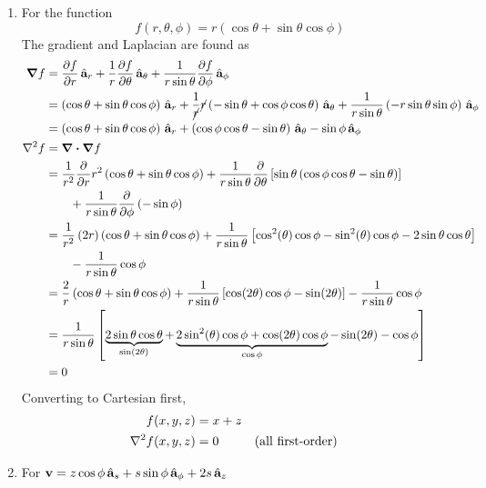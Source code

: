 \documentclass{homework}
\begin{document}
\begin{enumerate}
		\item For the function
		\[			f(r, \theta, \phi)  = r\left(\cos \theta + \sin \theta \cos \phi \right)\]
		The gradient and Laplacian are found as
		\begin{align*}
			\grad{ f } & = \pdv{f}{r} \uvec{r}
				+ \frac{1}{r} \pdv{f}{\theta} \uvec{\theta}
				+ \frac{1}{r \sin \theta} \pdv{f}{\phi} \uvec{\phi} \\
				& = \left( \cos \theta + \sin \theta \cos \phi\right) \uvec{r}
				+ \frac{1}{\cancel{r}} \cancel{r} \left(-\sin \theta + \cos \phi \cos \theta\right) \uvec{\theta}
				+  \frac{1}{r \sin \theta} \left(-r \sin \theta \sin \phi\right) \uvec{\phi}\\
				& = \left(\cos \theta + \sin \theta \cos \phi\right) \uvec{r} + \left(\cos \phi \cos \theta - \sin \theta\right) \uvec{\theta} 
				- \sin \phi \uvec{\phi} \\
			\laplacian{f} & = \div{ \grad{f} } \\
				& = \frac{1}{r^2} \pdv{r} r^2 \left(\cos \theta + \sin \theta \cos \phi\right)
				+ \frac{1}{r \sin \theta} \pdv{\theta} \left[\sin \theta \left(\cos \phi \cos \theta - \sin \theta\right)\right] \\
				& \qquad + \frac{1}{r \sin \theta} \pdv{\phi} \left(- \sin \phi\right) \\
				& = \frac{1}{r^2} \left(2r\right) \left(\cos \theta + \sin\theta \cos \phi \right)
				+ \frac{1}{r\sin \theta} \left[
					\cos[2](\theta) \cos \phi - \sin[2](\theta) \cos \phi - 2 \sin \theta \cos \theta
				\right] \\
				& \qquad - \frac{1}{r \sin \theta} \cos \phi \\
				& = \frac{2}{r} \left( \cos \theta + \sin \theta \cos \phi\right)
					+ \frac{1}{r \sin \theta} \left[ \cos(2 \theta) \cos \phi - \sin(2 \theta)\right]
					- \frac{1}{r \sin \theta} \cos \phi \\
				& = \frac{1}{r \sin \theta} \left[
					\underbrace{2 \sin \theta \cos \theta}_{\sin(2 \theta)} + \underbrace{2 \sin[2](\theta) \cos \phi + \cos(2 \theta) \cos \phi}_{\cos \phi} - \sin(2 \theta) - \cos \phi
				\right] \\
				& = 0
		\end{align*}
		Converting to Cartesian first, \begin{align*}
			f(x, y, z) & = x + z \\
			\laplacian{f(x, y, z)} & = 0 && \text{(all first-order)}
		\end{align*}
		\item For $\boldsymbol{\mathrm{v}} = z \cos \phi \thinspace\hat{ \mathbf{a}}_{s} + s \sin \phi \thinspace\hat{ \mathbf{a}}_{\phi} + 2 s \thinspace\hat{ \mathbf{a}}_{z}$ \begin{align*}

\end{align*}
\end{enumerate}
\end{document}
